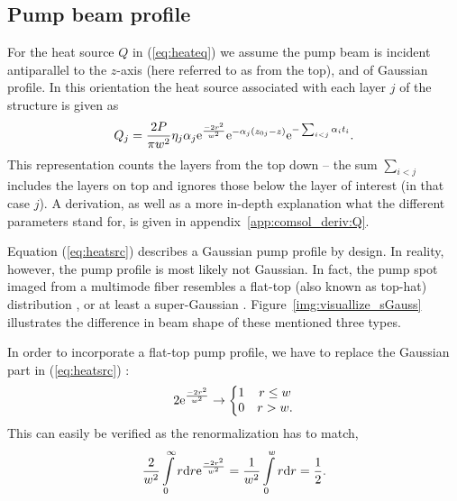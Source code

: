 \subsection{Pump beam profile}
\label{sec:comsol:beamprofile}

For the heat source $Q$
in (\ref{eq:heateq})
we assume
the pump beam
is incident antiparallel to the $z$-axis
(here referred to as from the top),
and of Gaussian profile.
In this orientation the heat source
associated with
each layer $j$ of the structure is given as
\cite{Kemp2008}
\begin{equation}
Q_j = \frac{2P}{\pi w^2} \eta_j\alpha_j \mathrm{e}^\frac{-2r^2}{w^2} \mathrm{e}^{-\alpha_j(z_{0j}-z)} \mathrm{e}^{-\sum_{i<j}\alpha_i t_i}.
\label{eq:heatsrc}
\end{equation}
This representation counts the layers
from the top down --
the sum $\sum_{i<j}$ includes the layers on top
and ignores those below the layer of interest
(in that case $j$).
A derivation,
as well as a more in-depth explanation
what the different parameters stand for,
is given in
appendix~\ref{app:comsol_deriv:Q}.

Equation (\ref{eq:heatsrc})
describes a Gaussian pump profile
by design.
In reality, however,
the pump profile is most likely not Gaussian.
In fact,
the pump spot imaged from a multimode fiber
resembles a flat-top
(also known as top-hat)
distribution \cite{Tropper2006},
or at least a super-Gaussian
\cite{Chernikov2010,Heinen2012el}.
Figure~\ref{img:visuallize_sGauss}
illustrates the difference in beam shape
of these mentioned three types.

In order to incorporate
a flat-top pump profile,
we have to replace the Gaussian part
in (\ref{eq:heatsrc}) \cite{Kemp2005}:
\begin{equation}
2\mathrm{e}^\frac{-2r^2}{w^2} \to
\left\{
\begin{matrix}
1 & r\leq w \\
0 & r>w.\\
\end{matrix}
\right.
\label{eq:replflattop}
\end{equation}
This can easily be verified as the renormalization has to match,
\begin{equation}
\frac{2}{w^2} \int\limits_0^\infty r \mathrm{d} r \mathrm{e}^\frac{-2r^2}{w^2}
= \frac{1}{w^2} \int\limits_0^w r \mathrm{d} r = \frac{1}{2}.
\label{eq:heatsrc_renorm}
\end{equation}

